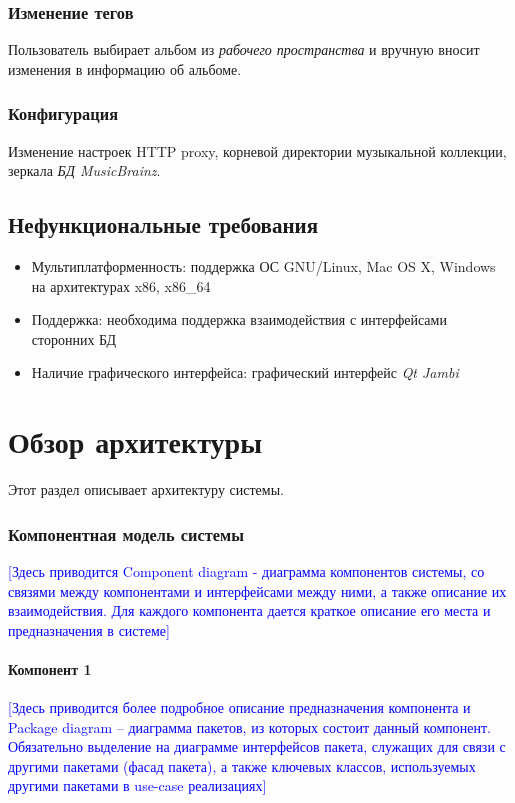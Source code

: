 \documentclass[pdftex,12pt,a4paper]{report}
\providecommand{\comment}[1]{\textcolor{blue}{#1}}
\begin{document}
\subsubsection{Изменение тегов}
Пользователь выбирает альбом из {\it рабочего пространства} и вручную вносит изменения в информацию об альбоме.

\subsubsection{Конфигурация}
Изменение настроек HTTP proxy, корневой директории музыкальной коллекции, зеркала {\it БД MusicBrainz}.

\subsection{Нефункциональные требования}
\begin{itemize}
	\item Мультиплатформенность: поддержка ОС GNU/Linux, Mac OS X, Windows на архитектурах x86, x86\_64
	\item Поддержка: необходима поддержка взаимодействия с интерфейсами сторонних БД
	\item Наличие графического интерфейса: графический интерфейс {\it Qt Jambi}
\end{itemize}

\section{Обзор архитектуры}
Этот раздел описывает архитектуру системы.

\setcounter{subsection}{1}
\subsubsection{Компонентная модель системы}
\comment{[Здесь приводится Component diagram  - диаграмма компонентов системы, со связями между компонентами  и интерфейсами между ними, а также описание их взаимодействия. Для каждого компонента дается краткое описание его места и предназначения в системе]}

\paragraph{Компонент 1}
\comment{[Здесь приводится более подробное описание предназначения компонента и Package diagram – диаграмма пакетов, из которых состоит данный компонент. Обязательно выделение на диаграмме интерфейсов пакета, служащих для связи с другими пакетами (фасад пакета), а также ключевых классов, используемых другими пакетами в use-case реализациях]}
\end{document}
